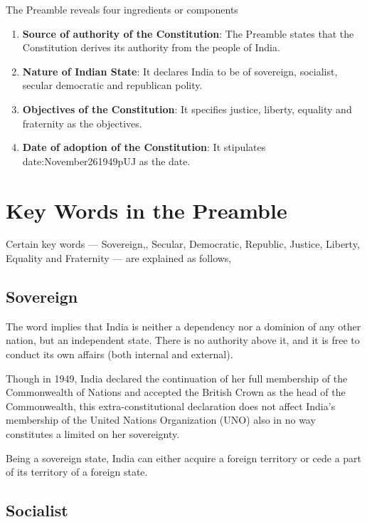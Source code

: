 The Preamble reveals four ingredients or components

\begin{enumerate}
  \item \textbf{Source of authority of the Constitution}: The Preamble states that the Constitution derives its authority from the people of India.
  \item \textbf{Nature of Indian State}: It declares India to be of sovereign, socialist, secular democratic and republican polity.
  \item \textbf{Objectives of the Constitution}: It specifies justice, liberty, equality and fraternity as the objectives.
  \item \textbf{Date of adoption of the Constitution}: It stipulates \gls{date:November261949pUJ} as the date.
\end{enumerate}


\section{Key Words in the Preamble}

Certain key words — Sovereign,, Secular, Democratic, Republic, Justice, Liberty, Equality and Fraternity — are explained as follows,

\subsection{Sovereign}

The word  implies that India is neither a dependency nor a dominion of any other nation, but an independent state. There is no authority above it, and it is free to conduct its own affairs (both internal and external).

Though in 1949, India declared the continuation of her full membership of the Commonwealth of Nations and accepted the British Crown as the head of the Commonwealth, this extra-constitutional declaration does not affect India's membership of the United Nations Organization (UNO) also in no way constitutes a limited on her sovereignty.

Being a sovereign state, India can either acquire a foreign territory or cede a part of its territory of a foreign state.

\subsection{Socialist}

